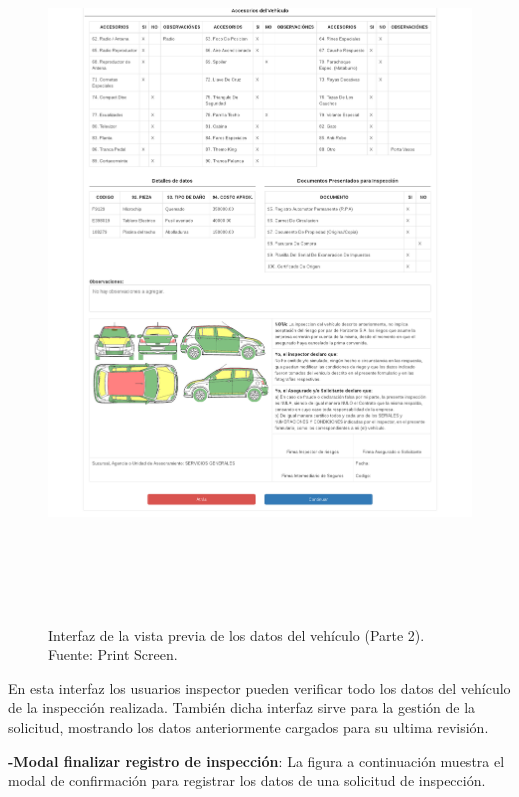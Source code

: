 \begin{figure}[H]
\begin{center}
	\includegraphics[width=\textwidth,height=19cm]{img/interfaces/prev_planilla_2.png}
\end{center}
\caption{Interfaz de la vista previa de los datos del vehículo (Parte 2). Fuente: Print Screen.}
\label{fig:interfaz_vista_previa_vehiculo_2}
\end{figure}

En esta interfaz los usuarios inspector pueden verificar todo los datos del vehículo de la inspección realizada. También dicha interfaz sirve para la gestión de la solicitud, mostrando los datos anteriormente cargados para su ultima revisión.


\textbf{-Modal finalizar registro de inspección}: La figura a continuación muestra el modal de confirmación para registrar los datos de una solicitud de inspección.

